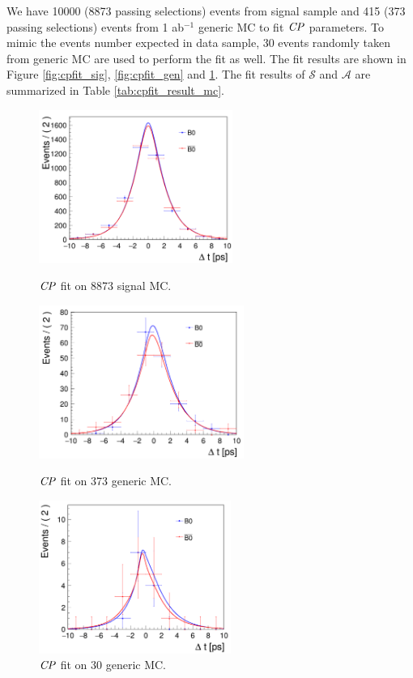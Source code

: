 We have 10000 (8873 passing selections) events from signal sample and 415 (373 passing selections) events from 1 ab$^{-1}$ generic MC to fit $\it{CP}$ parameters. To mimic the events number expected in data sample, 30 events randomly taken from generic MC are used to perform the fit as well. The fit results are shown in Figure \ref{fig:cpfit_sig}, \ref{fig:cpfit_gen} and \ref{fig:cpfit_gen_data}. The fit results of $\mathcal{S}$ and $\mathcal{A}$ are summarized in Table \ref{tab:cpfit_result_mc}.
\begin{figure}[H]
	\begin{minipage}{0.5\linewidth}
		\includegraphics[height=5cm]{figures/cpfit-10000sig}
		\caption{$\it{CP}$ fit on 8873 signal MC.}
		\label{fig:cpfit_sig}
	\end{minipage}
	\begin{minipage}{0.5\linewidth}
		\includegraphics[height=5cm]{figures/cpfit-373gen}
		\caption{$\it{CP}$ fit on 373 generic MC.}
		\label{fig:cpfit_gen}
	\end{minipage}
\vspace{0.5cm}
	\begin{minipage}{1\linewidth}
		\centering
		\includegraphics[height=5cm]{figures/cpfit-30gen}
		\caption{$\it{CP}$ fit on 30 generic MC.}
		\label{fig:cpfit_gen_data}
	\end{minipage}
\end{figure}


